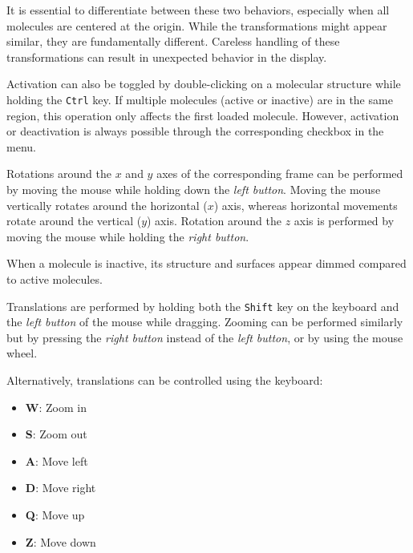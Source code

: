 \documentclass[10pt]{article}
\begin{document}
It is essential to differentiate between these two behaviors, especially when all molecules  
are centered at the origin. While the transformations might appear similar, they are fundamentally  
different. Careless handling of these transformations can result in unexpected behavior in the display.  

Activation can also be toggled by double-clicking  
on a molecular structure while holding the \texttt{Ctrl} key.  
If multiple molecules (active or inactive) are in the same region, this operation only affects  
the first loaded molecule. However, activation or deactivation is always possible  
through the corresponding checkbox in the menu.  

\vspace*{5mm}{\bf Rotations and Translations}\vspace*{5mm}  

Rotations  
around the $x$ and $y$ axes of the corresponding frame can be performed  
by moving the mouse while holding down the {\it left button}.  
Moving the mouse vertically rotates around the horizontal ($x$) axis,  
whereas horizontal movements rotate around the vertical ($y$) axis.  
Rotation around the $z$ axis is performed by moving the mouse while holding the {\it right button}.  

When a molecule is inactive, its structure and surfaces appear dimmed compared to active molecules.  

Translations  
are performed by holding both the \texttt{Shift} key on the keyboard and the {\it left button}  
of the mouse while dragging.  
Zooming can be performed similarly but by pressing  
the {\it right button} instead of the {\it left button}, or by using the mouse wheel.  

Alternatively, translations can be controlled using the keyboard:  
\begin{itemize}
    \item {\bf W}: Zoom in  
    \item {\bf S}: Zoom out  
    \item {\bf A}: Move left  
    \item {\bf D}: Move right  
    \item {\bf Q}: Move up  
    \item {\bf Z}: Move down  
\end{itemize}
\end{document}
